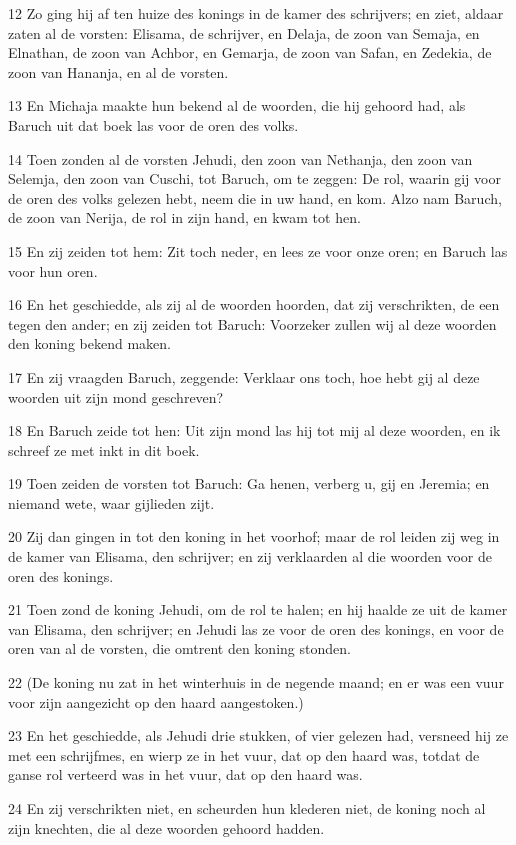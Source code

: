\par 12 Zo ging hij af ten huize des konings in de kamer des schrijvers; en ziet, aldaar zaten al de vorsten: Elisama, de schrijver, en Delaja, de zoon van Semaja, en Elnathan, de zoon van Achbor, en Gemarja, de zoon van Safan, en Zedekia, de zoon van Hananja, en al de vorsten.
\par 13 En Michaja maakte hun bekend al de woorden, die hij gehoord had, als Baruch uit dat boek las voor de oren des volks.
\par 14 Toen zonden al de vorsten Jehudi, den zoon van Nethanja, den zoon van Selemja, den zoon van Cuschi, tot Baruch, om te zeggen: De rol, waarin gij voor de oren des volks gelezen hebt, neem die in uw hand, en kom. Alzo nam Baruch, de zoon van Nerija, de rol in zijn hand, en kwam tot hen.
\par 15 En zij zeiden tot hem: Zit toch neder, en lees ze voor onze oren; en Baruch las voor hun oren.
\par 16 En het geschiedde, als zij al de woorden hoorden, dat zij verschrikten, de een tegen den ander; en zij zeiden tot Baruch: Voorzeker zullen wij al deze woorden den koning bekend maken.
\par 17 En zij vraagden Baruch, zeggende: Verklaar ons toch, hoe hebt gij al deze woorden uit zijn mond geschreven?
\par 18 En Baruch zeide tot hen: Uit zijn mond las hij tot mij al deze woorden, en ik schreef ze met inkt in dit boek.
\par 19 Toen zeiden de vorsten tot Baruch: Ga henen, verberg u, gij en Jeremia; en niemand wete, waar gijlieden zijt.
\par 20 Zij dan gingen in tot den koning in het voorhof; maar de rol leiden zij weg in de kamer van Elisama, den schrijver; en zij verklaarden al die woorden voor de oren des konings.
\par 21 Toen zond de koning Jehudi, om de rol te halen; en hij haalde ze uit de kamer van Elisama, den schrijver; en Jehudi las ze voor de oren des konings, en voor de oren van al de vorsten, die omtrent den koning stonden.
\par 22 (De koning nu zat in het winterhuis in de negende maand; en er was een vuur voor zijn aangezicht op den haard aangestoken.)
\par 23 En het geschiedde, als Jehudi drie stukken, of vier gelezen had, versneed hij ze met een schrijfmes, en wierp ze in het vuur, dat op den haard was, totdat de ganse rol verteerd was in het vuur, dat op den haard was.
\par 24 En zij verschrikten niet, en scheurden hun klederen niet, de koning noch al zijn knechten, die al deze woorden gehoord hadden.
